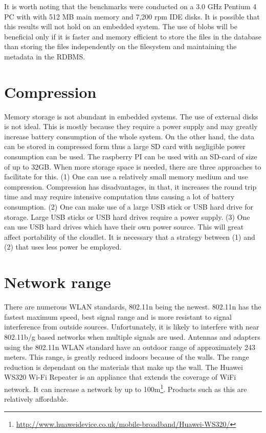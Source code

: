 \noindent It is worth noting that the benchmarks were conducted on a 3.0 GHz Pentium 4 PC with with 512 MB main memory and 7,200 rpm IDE disks. It is possible that this results will not hold on an embedded system.
The use of blobs will be beneficial only if it is faster and memory efficient to store the files in the database than storing the files independently on the filesystem and maintaining the metadata in the RDBMS.

\section{Compression}
Memory storage is not abundant in embedded systems. The use of external disks is not ideal. This is mostly because they require a power supply and may greatly increase battery consumption of the whole system. On
the other hand, the data can be stored in compressed form thus a large SD card with negligible power consumption can be used. The raspberry PI can be used with an SD-card of size of up to 32GB\cite{raspwebsite}. When more
storage space is needed, there are three approaches to facilitate for this. (1)
One can use a relatively small memory medium and use compression. Compression has disadvantages, in that, it increases the round trip time and may require intensive computation thus causing a lot of battery
consumption. (2) One can make use of a large USB stick or USB hard drive for storage. Large USB sticks or USB hard drives require a power supply. (3) One can use USB hard drives which have their own power source.
This will great affect portability of the cloudlet. It is necessary that a strategy between (1) and (2) that uses less power be employed.


\section{Network range}

There are numerous WLAN standards, 802.11n being the newest. 802.11n has the fastest maximum speed, best signal range and is more resistant to signal interference from outside sources\cite{RefWorks:104}.
Unfortunately, it is likely to interfere with near 802.11b/g based networks when multiple signals are used\cite{RefWorks:104}. Antennas and adapters using the 802.11n WLAN standard have an outdoor range of
approximately 243 meters\cite{RefWorks:103}. This range, is greatly reduced indoors because of the walls. The range reduction is dependant on the materials that make up the wall. The Huawei WS320 Wi-Fi Repeater
is an appliance that extends the coverage of WiFi network. It can increase a network by up to 100m\footnote{\url{http://www.huaweidevice.co.uk/mobile-broadband/Huawei-WS320/}}. Products such as this are relatively affordable.\newline

